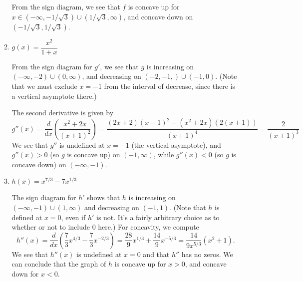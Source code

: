 \documentclass[12pt]{article}
\begin{document}
\begin{enumerate}
\begin{enumerate}
From the sign diagram, we see that $f$ is concave up for $x\in (-\infty,-1/\sqrt{3})\cup (1/\sqrt{3},\infty)$, and concave down on $(-1/\sqrt{3},1/\sqrt{3})$.

\bigskip


 \item $g(x) = \dfrac{x^2}{1+x}$

\bigskip

 From the sign diagram for $g'$, we see that $g$ is increasing on $(-\infty, -2)\cup(0,\infty)$, and decreasing on $(-2,-1,)\cup (-1,0)$. (Note that we must exclude $x=-1$ from the interval of decrease, since there is a vertical asymptote there.)

 The second derivative is given by
\[
 g''(x) = \frac{d}{dx}\left(\frac{x^2+2x}{(x+1)^2}\right) = \frac{(2x+2)(x+1)^2-(x^2+2x)(2(x+1))}{(x+1)^4} = \frac{2}{(x+1)^3}
\]
 We see that $g''$ is undefined at $x=-1$ (the vertical asymptote), and $g''(x)>0$ (so $g$ is concave up) on $(-1,\infty)$, while $g''(x)<0$ (so $g$ is concave down) on $(-\infty, -1)$.

\bigskip


 \item $h(x) = x^{7/3}-7x^{1/3}$

\bigskip

 The sign diagram for $h'$ shows that $h$ is increasing on $(-\infty, -1)\cup (1,\infty)$ and decreasing on $(-1,1)$. (Note that $h$ is defined at $x=0$, even if $h'$ is not. It's a fairly arbitrary choice as to whether or not to include 0 here.) For concavity, we compute
\[
 h''(x) = \frac{d}{dx}\left(\frac{7}{3}x^{4/3}-\frac{7}{3}x^{-2/3}\right) = \frac{28}{9}x^{1/3}+\frac{14}{9}x^{-5/3} = \frac{14}{9x^{5/3}}(x^2+1).
\]
We see that $h''(x)$ is undefined at $x=0$ and that $h''$ has no zeros. We can conclude that the graph of $h$ is concave up for $x>0$, and concave down for $x<0$.
\end{enumerate}

\end{enumerate}
\end{document}
